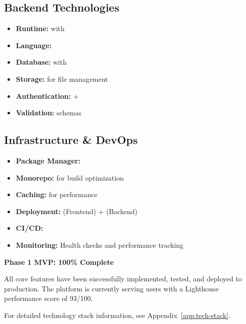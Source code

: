 \subsection{Backend Technologies}

\begin{itemize}[leftmargin=*]
    \item \textbf{Runtime:}  with 
    \item \textbf{Language:} 
    \item \textbf{Database:}  with 
    \item \textbf{Storage:}  for file management
    \item \textbf{Authentication:}  + 
    \item \textbf{Validation:}  schemas
\end{itemize}

\subsection{Infrastructure \& DevOps}

\begin{itemize}[leftmargin=*]
    \item \textbf{Package Manager:} 
    \item \textbf{Monorepo:}  for build optimization
    \item \textbf{Caching:}  for performance
    \item \textbf{Deployment:}  (Frontend) +  (Backend)
    \item \textbf{CI/CD:} 
    \item \textbf{Monitoring:} Health checks and performance tracking
\end{itemize}

\begin{successbox}
\textbf{Phase 1 MVP: 100\% Complete}

All core features have been successfully implemented, tested, and deployed to production. The platform is currently serving users with a Lighthouse performance score of 93/100.
\end{successbox}

\vspace{0.5cm}
\noindent
For detailed technology stack information, see Appendix~\ref{app:tech-stack}.
